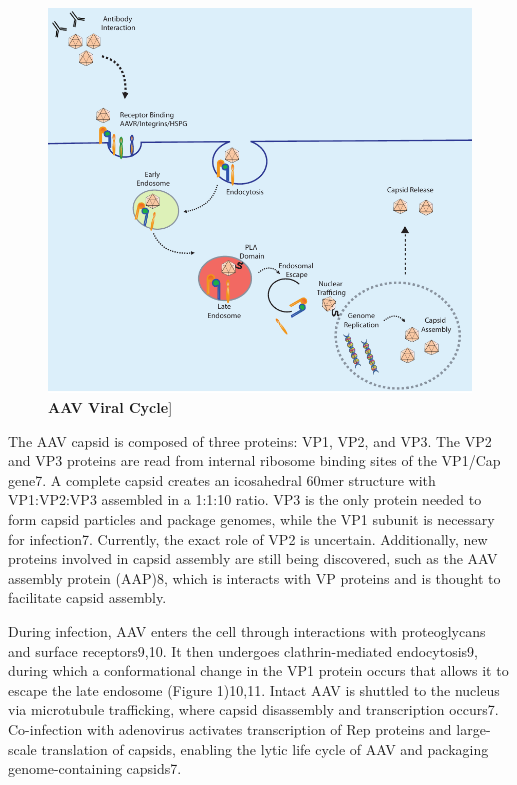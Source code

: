\begin{figure}[t!]
\includegraphics[width=\textwidth]{figures/20190612_aav_cell_diagram.pdf}
\caption[AAV Viral Cycle]{\textbf{AAV Viral Cycle}]
\label{fig:Figure 0.1}}
\end{figure}

The AAV capsid is composed of three proteins: VP1, VP2, and VP3. The VP2 and VP3 proteins are read from internal ribosome binding sites of the VP1/Cap gene7. A complete capsid creates an icosahedral 60mer structure with VP1:VP2:VP3 assembled in a 1:1:10 ratio. VP3 is the only protein needed to form capsid particles and package genomes, while the VP1 subunit is necessary for infection7. Currently, the exact role of VP2 is uncertain. Additionally, new proteins involved in capsid assembly are still being discovered, such as the AAV assembly protein (AAP)8, which is interacts with VP proteins and is thought to facilitate capsid assembly.

During infection, AAV enters the cell through interactions with proteoglycans and surface receptors9,10. It then undergoes clathrin-mediated endocytosis9, during which a conformational change in the VP1 protein occurs that allows it to escape the late endosome (Figure 1)10,11. Intact AAV is shuttled to the nucleus via microtubule trafficking, where capsid disassembly and transcription occurs7. Co-infection with adenovirus activates transcription of Rep proteins and large-scale translation of capsids, enabling the lytic life cycle of AAV and packaging genome-containing capsids7.
    

